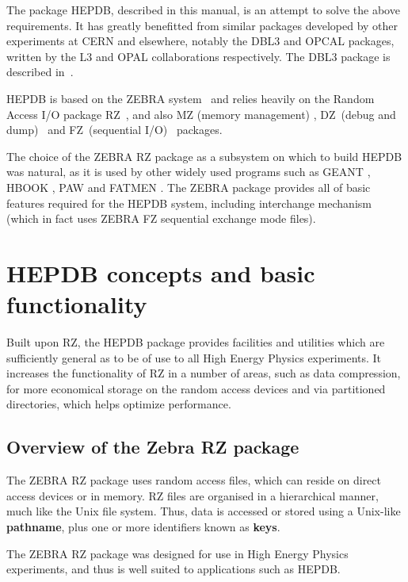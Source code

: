 The package HEPDB, described in this manual, is an attempt to
solve the above requirements. It has greatly benefitted from
similar packages developed by other experiments at CERN and elsewhere,
notably the DBL3 and OPCAL packages,
written by the L3 and OPAL collaborations respectively.
The DBL3 package is described in~\cite{bib-DBL3}.

HEPDB is based on the ZEBRA system~\cite{bib-ZEBRA} and relies heavily on
the Random Access I/O package RZ~\cite{bib-ZEBRARZ}, and also
MZ (memory management) \cite{bib-ZEBRAMZ},
DZ~(debug and dump)~\cite{bib-ZEBRADZ} and
FZ~(sequential I/O)~\cite{bib-ZEBRAFZ} packages.

The choice of the ZEBRA RZ package as a subsystem on which
to build HEPDB was natural, as it is used by other widely used
programs such as GEANT \cite{bib-GEANT}, HBOOK \cite{bib-HBOOK},
PAW \cite{bib-PAW} and FATMEN \cite{bib-FATMEN}.
The ZEBRA package provides all of basic features required for the HEPDB
system, including interchange mechanism (which in fact uses
ZEBRA FZ sequential exchange mode files).
\chapter{HEPDB concepts and basic functionality}

Built upon RZ, the HEPDB package provides facilities and utilities
which are sufficiently general as to be of use to all High Energy
Physics experiments.
It increases the functionality of RZ in a number of areas, such
as  data compression, for more
economical storage on the random access devices and via
partitioned directories, which helps optimize performance.

\section{Overview of the Zebra RZ package}

The ZEBRA RZ \cite{bib-ZEBRARZ} package uses random access files,
which can reside on direct access devices or in memory.
RZ files are organised in a hierarchical manner, much like
the Unix file system. Thus, data is accessed or stored using a Unix-like
{\bf pathname}, plus one or more identifiers known as {\bf keys}.

The ZEBRA RZ package was designed for use in High Energy Physics experiments,
and thus is well suited to applications such as HEPDB.


